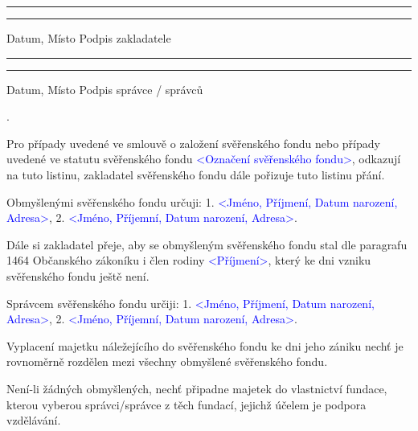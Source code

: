 \documentclass[parskip=half]{scrreprt}
\begin{document}
\vspace{50pt} 
\noindent\rule{7cm}{.4pt}\hfill\rule{7cm}{.4pt}\par 
\noindent Datum, Místo \hfill Podpis zakladatele

\vspace{50pt} 
\noindent\rule{7cm}{.4pt}\hfill\rule{7cm}{.4pt}\par 
\noindent Datum, Místo \hfill Podpis správce / správců

.

\begin{contract}



Pro případy uvedené ve smlouvě o založení svěřenského fondu nebo případy uvedené ve statutu svěřenského fondu \textcolor{blue}{<Označení svěřenského fondu>}, odkazují na tuto listinu, zakladatel svěřenského fondu dále pořizuje tuto listinu přání.


Obmyšlenými svěřenského fondu určuji:
1. \textcolor{blue}{<Jméno, Příjmení, Datum narození, Adresa>},
2. \textcolor{blue}{<Jméno, Příjemní, Datum narození, Adresa>}.

Dále si zakladatel přeje, aby se obmyšleným svěřenského fondu stal dle paragrafu 1464 Občanského zákoníku i člen rodiny \textcolor{blue}{<Příjmení>}, který ke dni vzniku svěřenského fondu ještě není.


Správcem svěřenského fondu určiji:
1. \textcolor{blue}{<Jméno, Příjmení, Datum narození, Adresa>},
2. \textcolor{blue}{<Jméno, Příjemní, Datum narození, Adresa>}.


Vyplacení majetku náležejícího do svěřenského fondu ke dni jeho zániku nechť je rovnoměrně rozdělen mezi všechny obmyšlené svěřenského fondu.

Není-li žádných obmyšlených, nechť připadne majetek do vlastnictví fundace, kterou vyberou správci/správce z těch fundací, jejichž účelem je podpora vzdělávání.



\end{contract}
\end{document}
